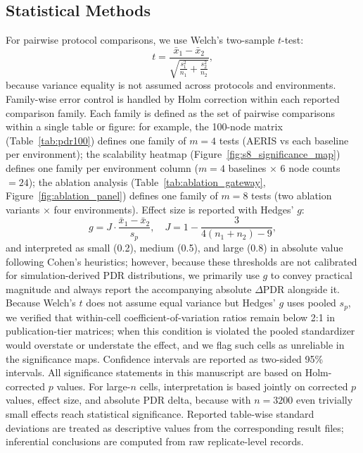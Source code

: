 ﻿\documentclass[sensors,article,submit,moreauthors,pdftex]{Definitions/mdpi}
\begin{document}
\subsection{Statistical Methods}
For pairwise protocol comparisons, we use Welch's two-sample $t$-test:
\begin{equation}
t=\frac{\bar{x}_1-\bar{x}_2}{\sqrt{\frac{s_1^2}{n_1}+\frac{s_2^2}{n_2}}},
\end{equation}
because variance equality is not assumed across protocols and environments. Family-wise error control is handled by Holm correction within each reported comparison family. Each family is defined as the set of pairwise comparisons within a single table or figure: for example, the 100-node matrix (Table~\ref{tab:pdr100}) defines one family of $m=4$ tests (AERIS vs each baseline per environment); the scalability heatmap (Figure~\ref{fig:s8_significance_map}) defines one family per environment column ($m=4$ baselines $\times$ 6 node counts $= 24$); the ablation analysis (Table~\ref{tab:ablation_gateway}, Figure~\ref{fig:ablation_panel}) defines one family of $m=8$ tests (two ablation variants $\times$ four environments). Effect size is reported with Hedges' $g$:
\begin{equation}
g = J\cdot\frac{\bar{x}_1-\bar{x}_2}{s_p},\quad
J=1-\frac{3}{4(n_1+n_2)-9},
\end{equation}
and interpreted as small (0.2), medium (0.5), and large (0.8) in absolute value following Cohen's heuristics; however, because these thresholds are not calibrated for simulation-derived PDR distributions, we primarily use $g$ to convey practical magnitude and always report the accompanying absolute $\Delta$PDR alongside it. Because Welch's $t$ does not assume equal variance but Hedges' $g$ uses pooled $s_p$, we verified that within-cell coefficient-of-variation ratios remain below 2:1 in publication-tier matrices; when this condition is violated the pooled standardizer would overstate or understate the effect, and we flag such cells as unreliable in the significance maps. Confidence intervals are reported as two-sided 95\% intervals. All significance statements in this manuscript are based on Holm-corrected $p$ values. For large-$n$ cells, interpretation is based jointly on corrected $p$ values, effect size, and absolute PDR delta, because with $n=3200$ even trivially small effects reach statistical significance. Reported table-wise standard deviations are treated as descriptive values from the corresponding result files; inferential conclusions are computed from raw replicate-level records.
\end{document}
